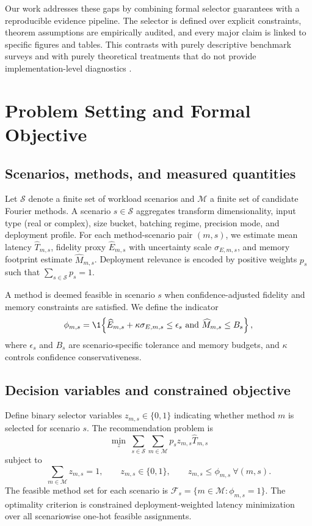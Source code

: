 \documentclass{article} %
\begin{document}
Our work addresses these gaps by combining formal selector guarantees with a reproducible evidence pipeline. The selector is defined over explicit constraints, theorem assumptions are empirically audited, and every major claim is linked to specific figures and tables. This contrasts with purely descriptive benchmark surveys and with purely theoretical treatments that do not provide implementation-level diagnostics \citep{S07,S09,S39,S42}.

\section{Problem Setting and Formal Objective}
\subsection{Scenarios, methods, and measured quantities}
Let $\mathcal{S}$ denote a finite set of workload scenarios and $\mathcal{M}$ a finite set of candidate Fourier methods. A scenario $s \in \mathcal{S}$ aggregates transform dimensionality, input type (real or complex), size bucket, batching regime, precision mode, and deployment profile. For each method-scenario pair $(m,s)$, we estimate mean latency $\widehat{T}_{m,s}$, fidelity proxy $\widehat{E}_{m,s}$ with uncertainty scale $\sigma_{E,m,s}$, and memory footprint estimate $\widehat{M}_{m,s}$. Deployment relevance is encoded by positive weights $p_s$ such that $\sum_{s\in\mathcal{S}} p_s = 1$.

A method is deemed feasible in scenario $s$ when confidence-adjusted fidelity and memory constraints are satisfied. We define the indicator
\begin{equation}
\phi_{m,s}=\1\!\left\{\widehat{E}_{m,s}+\kappa\sigma_{E,m,s}\le \epsilon_s\ \text{and}\ \widehat{M}_{m,s}\le B_s\right\},
\label{eq:feasible_indicator}
\end{equation}
where $\epsilon_s$ and $B_s$ are scenario-specific tolerance and memory budgets, and $\kappa$ controls confidence conservativeness.

\subsection{Decision variables and constrained objective}
Define binary selector variables $z_{m,s}\in\{0,1\}$ indicating whether method $m$ is selected for scenario $s$. The recommendation problem is
\begin{equation}
\min_{z}\ \sum_{s\in\mathcal{S}}\sum_{m\in\mathcal{M}} p_s z_{m,s}\widehat{T}_{m,s}
\label{eq:selector_obj}
\end{equation}
subject to
\begin{equation}
\sum_{m\in\mathcal{M}} z_{m,s}=1,\qquad z_{m,s}\in\{0,1\},\qquad z_{m,s}\le \phi_{m,s}\ \forall (m,s).
\label{eq:selector_constraints}
\end{equation}
The feasible method set for each scenario is $\mathcal{F}_s=\{m\in\mathcal{M}:\phi_{m,s}=1\}$. The optimality criterion is constrained deployment-weighted latency minimization over all scenariowise one-hot feasible assignments.
\end{document}
